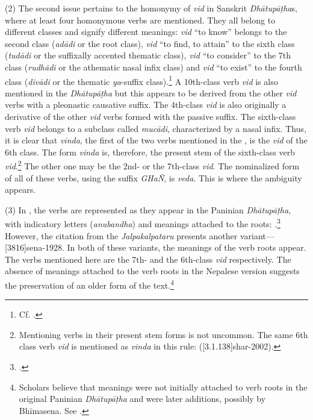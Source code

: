 (2) The second issue pertains to the homonymy of \emph{vid} in Sanskrit 
\emph{Dhātupāṭha}s, 
	 		where at least four homonymous verbs are mentioned. 
	 		They all belong to different classes and signify different meanings: 
	 		\emph{\root vid} “to know” belongs to the second class (\emph{adādi} or 
the root class), 
	 		\emph{\root vid} “to find, to attain” to the sixth class (\emph{tudādi} or 
the suffixally accented thematic class), 
	 		\emph{\root vid} “to consider” to the 7th class (\emph{rudhādi} or the 
athematic nasal infix class) and 
	 		\emph{\root vid} “to exist” to the fourth class (\emph{divādi} or the 
thematic \emph{ya}-suffix class).\footnote{
	 			Cf.  
	 			\parencite[402]{gada-1904}.}  
 			A 10th-class verb \emph{\root vid} is also mentioned in the 
\emph{Dhātupāṭha} 
 			but this appears to be derived from the other \emph{vid} verbs with a 
pleonastic causative suffix. 
 			The 4th-class \emph{vid} is also originally a derivative of the other 
\emph{vid} verbs formed with the passive suffix. 
 			The sixth-class verb \emph{vid} belongs to a subclass called 
\emph{mucādi}, characterized by a nasal infix. 
 			Thus, it is clear that \emph{vinda}, the first of the two verbs mentioned in 
the \SS, 
 			is the \emph{vid} of the 6th class. 
 			The form \emph{vinda} is, therefore, the present stem of the sixth-class 
verb \emph{vid}.\footnote{ 
 				Mentioning verbs in their present stem forms is not uncommon.
 				The same 6th class verb \root \emph{vid} is mentioned as 
\emph{vinda} in this rule:
(\volcite{}[3.1.138]{shar-2002}).}
 			 The other one may be the 2nd- or the 7th-class \emph{vid}. 
 			 The nominalized form of all of these verbs, using the suffix \emph{GHaÑ}, 
is \emph{veda}. 
 			 This is where the ambiguity appears. 
	 		
(3) In \SuComma{}{}, the verbs are represented as they appear 
	 		in the Paninian \emph{Dhātupāṭha}, with indicatory letters 
(\emph{anubandha}) and meanings attached to the roots:
	 		.\footnote{.}
	 		However, the citation from the \emph{Jalpakalpataru} presents another 
variant--- 
	 		[3816]{sena-1928}. 
	 		In both of these variants, the meanings of the verb roots appear. 
	 		The verbs mentioned here are the 7th- and the 6th-class \root \emph{vid} 
respectively. 
	 		The absence of meanings attached to the verb roots in the Nepalese 
version suggests the preservation 
	 		of an older form of the text.\footnote{
	 				Scholars believe that meanings were not initially attached to verb 
roots 
	 				in the original Paninian \emph{Dhātupāṭha} 
	 				and were later additions, possibly by Bhīmasena. See 
\cite[161--163]{card-1976}.}
 				
